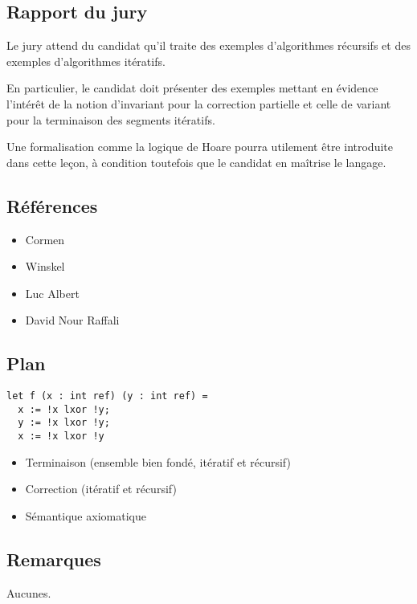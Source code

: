 \documentclass[../../Agregation.tex]{subfiles}
\begin{document}

\subsection{Rapport du jury}

\begin{aquote}{}
Le jury attend du candidat qu'il traite des exemples d'algorithmes récursifs et des exemples d'algorithmes itératifs.

En particulier, le candidat doit présenter des exemples mettant en évidence l'intérêt de la notion d'invariant pour la correction partielle et celle de variant pour la terminaison des segments itératifs.

Une formalisation comme la logique de Hoare pourra utilement être introduite dans cette leçon, à condition toutefois que le candidat en maîtrise le langage.
\end{aquote}

\dvts

\subsection{Références}

\begin{itemize}
	\item Cormen
	\item Winskel
	\item Luc Albert
	\item David Nour Raffali
\end{itemize}

\subsection{Plan}

\begin{lstlisting}[language=caml]
let f (x : int ref) (y : int ref) =
  x := !x lxor !y;
  y := !x lxor !y;
  x := !x lxor !y
\end{lstlisting}

\begin{itemize}
	\item Terminaison (ensemble bien fondé, itératif et récursif)
	\item Correction (itératif et récursif)
	\item Sémantique axiomatique
\end{itemize}

\subsection{Remarques}

Aucunes.
\end{document}
